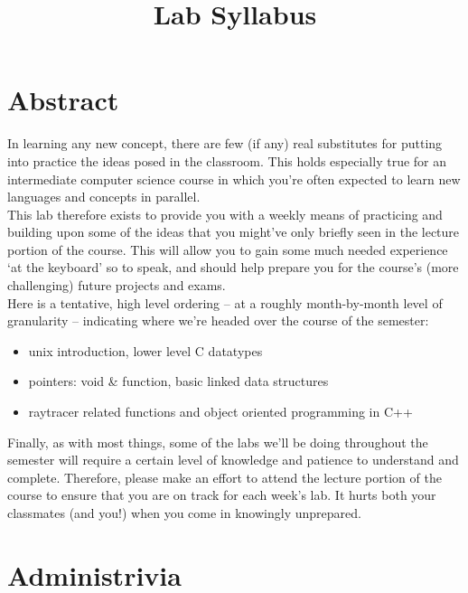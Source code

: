 \documentclass[12pt]{article}
\begin{document}
\title{\vspace{-.35in}Lab Syllabus}
\date{\empty}
\maketitle

\pagestyle{fancy}
\thispagestyle{fancy}

\vspace{-.75in}
\section{Abstract}

In learning any new concept, there are few (if any) real substitutes for putting into practice the ideas posed in the classroom. This holds especially true for an intermediate computer science course in which you're often expected to learn new languages and concepts in parallel. \\

\noindent This lab therefore exists to provide you with a weekly means of practicing and building upon some of the ideas that you might've only briefly seen in the lecture portion of the course. This will allow you to gain some much needed experience `at the keyboard' so to speak, and should help prepare you for the course's (more challenging) future projects and exams. \\

\noindent Here is a tentative, high level ordering -- at a roughly month-by-month level of granularity -- indicating where we're headed over the course of the semester:

\begin{itemize}
\item unix introduction, lower level C datatypes
\item pointers: void \& function, basic linked data structures
\item raytracer related functions and object oriented programming in C++
\end{itemize}

\noindent Finally, as with most things, some of the labs we'll be doing throughout the semester will require a certain level of knowledge and patience to understand and complete. Therefore, please make an effort to attend the lecture portion of the course to ensure that you are on track for each week's lab. It hurts both your classmates (and you!) when you come in knowingly unprepared.

\section{Administrivia}
\end{document}
